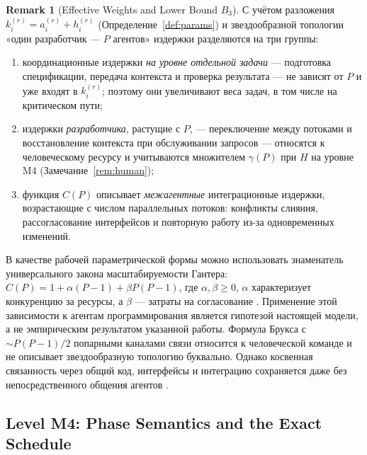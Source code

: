 \documentclass[12pt,a4paper]{article}
\theoremstyle{definition}
\newtheorem{remark}{Remark}
\begin{document}
\begin{remark}[Effective Weights and Lower Bound $B_3$]
С учётом разложения $k_i^{(r)} = a_i^{(r)} + h_i^{(r)}$ (Определение~\ref{def:params}) и звездообразной топологии «один разработчик --- $P$ агентов» издержки разделяются на три группы:
\begin{enumerate}
  \item координационные издержки \emph{на уровне отдельной задачи} --- подготовка спецификации, передача контекста и проверка результата --- не зависят от $P$ и уже входят в $k_i^{(r)}$; поэтому они увеличивают веса задач, в том числе на критическом пути;
  \item издержки \emph{разработчика}, растущие с $P$, --- переключение между потоками и восстановление контекста при обслуживании запросов --- относятся к человеческому ресурсу и учитываются множителем $\gamma(P)$ при $H$ на уровне M4 (Замечание~\ref{rem:human});
  \item функция $C(P)$ описывает \emph{межагентные} интеграционные издержки, возрастающие с числом параллельных потоков: конфликты слияния, рассогласование интерфейсов и повторную работу из-за одновременных изменений.
\end{enumerate}
В качестве рабочей параметрической формы можно использовать знаменатель универсального закона масштабируемости Гантера:
$C(P) = 1 + \alpha (P - 1) + \beta P (P - 1)$, где $\alpha,\beta\ge0$, $\alpha$ характеризует конкуренцию за ресурсы, а $\beta$ --- затраты на согласование \cite{gunther2008general}. Применение этой зависимости к агентам программирования является гипотезой настоящей модели, а не эмпирическим результатом указанной работы. Формула Брукса с $\sim P(P-1)/2$ попарными каналами связи относится к человеческой команде и не описывает звездообразную топологию буквально. Однако косвенная связанность через общий код, интерфейсы и интеграцию сохраняется даже без непосредственного общения агентов \cite{brooks1995mythical}.
\end{remark}

\subsection{Level M4: Phase Semantics and the Exact Schedule}
\end{document}
